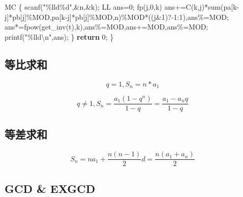 \documentclass[
]{article}
\newenvironment{Shaded}{}{}
\newcommand{\ControlFlowTok}[1]{\textcolor[rgb]{0.00,0.44,0.13}{\textbf{#1}}}
\newcommand{\DecValTok}[1]{\textcolor[rgb]{0.25,0.63,0.44}{#1}}
\newcommand{\NormalTok}[1]{#1}
\newcommand{\SpecialCharTok}[1]{\textcolor[rgb]{0.25,0.44,0.63}{#1}}
\newcommand{\StringTok}[1]{\textcolor[rgb]{0.25,0.44,0.63}{#1}}
\begin{document}
\begin{Shaded}
\begin{Highlighting}[]
\NormalTok{    MC}
\NormalTok{    \{}
\NormalTok{        scanf(}\StringTok{"}\SpecialCharTok{\%lld\%d}\StringTok{"}\NormalTok{,\&n,\&k);}
\NormalTok{        LL ans=}\DecValTok{0}\NormalTok{;}
\NormalTok{        fp(j,}\DecValTok{0}\NormalTok{,k)}
\NormalTok{            ans+=C(k,j)*sum(pa[k{-}j]*pb[j]\%MOD,pa[k{-}j]*pb[j]\%MOD,n)\%MOD*((j\&}\DecValTok{1}\NormalTok{)?{-}}\DecValTok{1}\NormalTok{:}\DecValTok{1}\NormalTok{),ans\%=MOD;}
\NormalTok{        ans*=fpow(get\_inv(t),k),ans\%=MOD,ans+=MOD,ans\%=MOD;}
\NormalTok{        printf(}\StringTok{"}\SpecialCharTok{\%lld\textbackslash{}n}\StringTok{"}\NormalTok{,ans);}
\NormalTok{    \}}
    \ControlFlowTok{return} \DecValTok{0}\NormalTok{;}
\NormalTok{\}}
\end{Highlighting}
\end{Shaded}

\hypertarget{ux7b49ux6bd4ux6c42ux548c}{%
\subsection{等比求和}\label{ux7b49ux6bd4ux6c42ux548c}}

\[
    q = 1, S_{n} = n*a_{1} 
\]

\[
    q \neq 1, S_{n} = \frac{a_1(1-q^n)}{1-q}=\frac{a_1-a_{n}q}{1-q}
\]

\hypertarget{ux7b49ux5deeux6c42ux548c}{%
\subsection{等差求和}\label{ux7b49ux5deeux6c42ux548c}}

\[
    S_{n} = na_{1} + \frac{n(n-1)}{2}d = \frac{n(a_{1} + a_{n})}{2}
\]

\hypertarget{gcd-exgcd}{%
\subsection{GCD \& EXGCD}\label{gcd-exgcd}}
\end{document}
